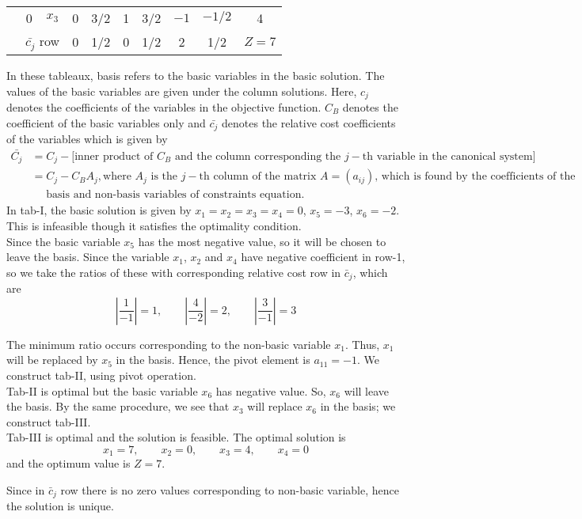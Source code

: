 \documentclass[../main-sheet.tex]{subfiles}
\begin{document}
\begin{soln}
\begin{table}[H]
\begin{tabular}{cccccccccc}
            & 0     & $x_3$ & 0     & 3/2   & 1     & 3/2   & $-1$    & $-1/2$  & 4 \\
  \cmidrule{2-10}          & \multicolumn{2}{c}{$ \bar{c_j} $ row} & 0     & 1/2   & 0     & 1/2   & 2     & 1/2   & $Z=7$ \\
      \bottomrule
      \end{tabular}%
  \end{table}%
  In these tableaux, basis refers to the basic variables in the basic solution. The values of the basic variables are given under the column solutions. Here, \(c_j\) denotes the coefficients of the variables in the objective function. \(C_B\) denotes the coefficient of the basic variables only and \(\bar{c_j}\) denotes the relative cost coefficients of the variables which is given by
  \begin{align*}
    \bar{C_j}&=C_j-\text{[inner product of \(C_B\) and the column corresponding the \(j-\)th variable in the canonical system]}\\
    &=C_j-C_BA_j,\text{where \(A_j\) is the \(j-\)th column of the matrix \(A=(a_{ij})\), which is found by the coefficients of the} \\
    & \quad\text{ basis and non-basis variables of constraints equation.}
\end{align*}
In tab-I, the basic solution is given by \(x_1=x_2=x_3=x_4=0\), \(x_5=-3\), \(x_6=-2\). This is infeasible though it satisfies the optimality condition.\\

Since the basic variable \(x_5\) has the most negative value, so it will be chosen to leave the basis. Since the variable \(x_1\), \(x_2\) and \(x_4\) have negative coefficient in row-1, so we take the ratios of these with corresponding relative cost row in \(\bar{c}_j\), which are
\[
    \left\vert\frac{1}{-1}\right\vert=1,\qquad \left\vert\frac{4}{-2}\right\vert=2,\qquad \left\vert\frac{3}{-1}\right\vert=3
\]

The minimum ratio occurs corresponding to the non-basic variable \(x_1\). Thus, \(x_1\) will be replaced by \(x_5\) in the basis. Hence, the pivot element is \(a_{11}=-1\). We construct tab-II, using pivot operation.\\

Tab-II is optimal but the basic variable \(x_6\) has negative value. So, \(x_6\) will leave the basis. By the same procedure, we see that \(x_3\) will replace \(x_6\) in the basis; we construct tab-III.\\

Tab-III is optimal and the solution is feasible. The optimal solution is
\[
    x_1=7,\qquad x_2=0,\qquad x_3=4,\qquad x_4=0
\]
and the optimum value is \(Z=7\).

Since in \(\bar{c}_j\) row there is no zero values corresponding to non-basic variable, hence the solution is unique.
\end{soln}
\end{document}

